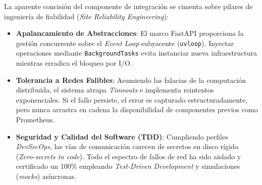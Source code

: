 La aparente concisión del componente de integración se cimenta sobre pilares de ingeniería de fiabilidad (\textit{Site Reliability Engineering}):
\begin{itemize}
    \item \textbf{Apalancamiento de Abstracciones}: El marco FastAPI proporciona la gestión concurrente sobre el \textit{Event Loop} subyacente (\texttt{uvloop}). Inyectar operaciones mediante \texttt{BackgroundTasks} evita instanciar nueva infraestructura mientras erradica el bloqueo por I/O.
    \item \textbf{Tolerancia a Redes Falibles}: Asumiendo las falacias de la computación distribuida, el sistema atrapa \textit{Timeouts} e implementa reintentos exponenciales. Si el fallo persiste, el error es capturado estructuradamente, pero nunca arrastra en cadena la disponibilidad de componentes previos como Prometheus.
    \item \textbf{Seguridad y Calidad del Software (TDD)}: Cumpliendo perfiles \textit{DevSecOps}, las vías de comunicación carecen de secretos en disco rígido (\textit{Zero-secrets in code}). Todo el espectro de fallos de red ha sido aislado y certificado un 100\% empleando \textit{Test-Driven Development} y simulaciones (\textit{mocks}) asíncronas.
\end{itemize}
